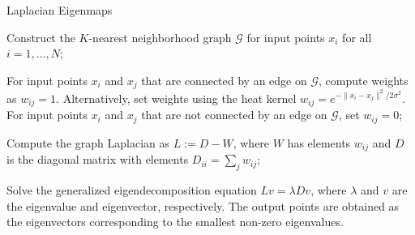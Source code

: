 \documentclass{article}
\begin{document}
\begin{algorithm}[!htb]
  \caption{Laplacian Eigenmaps}
  \label{alg:le}
  \DontPrintSemicolon
  \SetAlgoLined
  \BlankLine

  Construct the $K$-nearest neighborhood graph $\mathcal{G}$ for input points $x_i$ for all $i=1,\ldots,N$;

  For input points $x_i$ and $x_j$ that are connected by an edge on $\mathcal{G}$, compute weights as $w_{ij}=1$. Alternatively, set weights using the heat kernel $w_{i j}=e^{-\|x_{i}-x_{j}\|^{2} / 2 \sigma^{2}}$. For input points $x_i$ and $x_j$ that are not connected by an edge on $\mathcal{G}$, set $w_{ij}=0$;

  Compute the graph Laplacian as $L := D-W$, where $W$ has elements $w_{ij}$ and $D$ is the diagonal matrix with elements $D_{i i}=\sum_{j} w_{i j}$;

  Solve the generalized eigendecomposition equation $Lv = \lambda Dv$, where $\lambda$ and $v$ are the eigenvalue and eigenvector, respectively. The output points are obtained as the eigenvectors corresponding to the smallest non-zero eigenvalues.

\end{algorithm}
\end{document}
